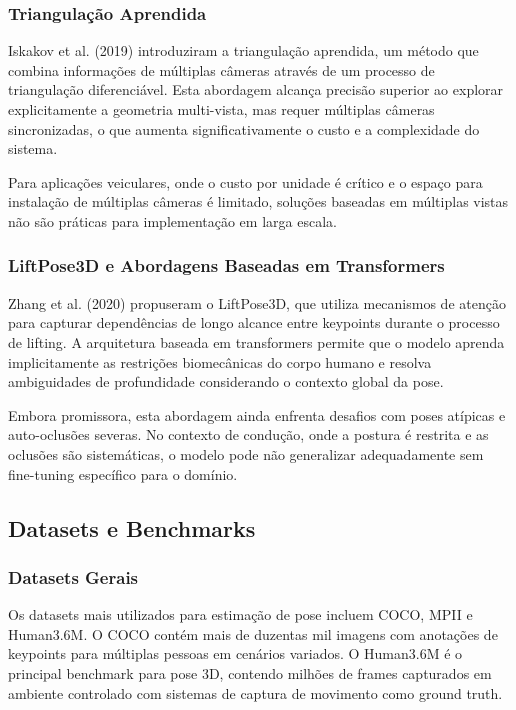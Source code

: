 \documentclass[12pt, a4paper]{article}
\begin{document}
\subsubsection{Triangulação Aprendida}

Iskakov et al. (2019) introduziram a triangulação aprendida, um método que combina informações de múltiplas câmeras através de um processo de triangulação diferenciável. Esta abordagem alcança precisão superior ao explorar explicitamente a geometria multi-vista, mas requer múltiplas câmeras sincronizadas, o que aumenta significativamente o custo e a complexidade do sistema.

Para aplicações veiculares, onde o custo por unidade é crítico e o espaço para instalação de múltiplas câmeras é limitado, soluções baseadas em múltiplas vistas não são práticas para implementação em larga escala.

\subsubsection{LiftPose3D e Abordagens Baseadas em Transformers}

Zhang et al. (2020) propuseram o LiftPose3D, que utiliza mecanismos de atenção para capturar dependências de longo alcance entre keypoints durante o processo de lifting. A arquitetura baseada em transformers permite que o modelo aprenda implicitamente as restrições biomecânicas do corpo humano e resolva ambiguidades de profundidade considerando o contexto global da pose.

Embora promissora, esta abordagem ainda enfrenta desafios com poses atípicas e auto-oclusões severas. No contexto de condução, onde a postura é restrita e as oclusões são sistemáticas, o modelo pode não generalizar adequadamente sem fine-tuning específico para o domínio.

\subsection{Datasets e Benchmarks}

\subsubsection{Datasets Gerais}

Os datasets mais utilizados para estimação de pose incluem COCO, MPII e Human3.6M. O COCO contém mais de duzentas mil imagens com anotações de keypoints para múltiplas pessoas em cenários variados. O Human3.6M é o principal benchmark para pose 3D, contendo milhões de frames capturados em ambiente controlado com sistemas de captura de movimento como ground truth.
\end{document}
